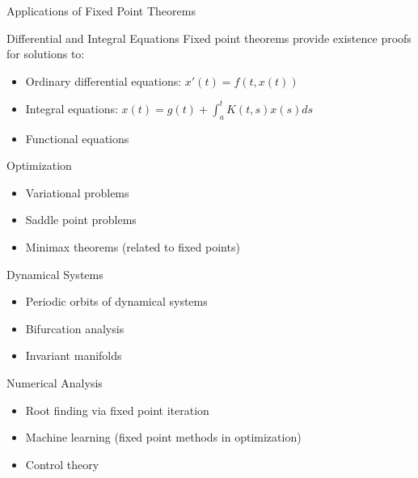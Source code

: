 \documentclass[aspectratio=169,10pt]{beamer}
\begin{document}
\begin{frame}[allowframebreaks]{Applications of Fixed Point Theorems}
    \begin{block}{Differential and Integral Equations}
        Fixed point theorems provide existence proofs for solutions to:
        \begin{itemize}
            \item Ordinary differential equations: $x'(t) = f(t, x(t))$
            \item Integral equations: $x(t) = g(t) + \int_a^t K(t,s) x(s) ds$
            \item Functional equations
        \end{itemize}
    \end{block}

    \begin{block}{Optimization}
        \begin{itemize}
            \item Variational problems
            \item Saddle point problems
            \item Minimax theorems (related to fixed points)
        \end{itemize}
    \end{block}

    \begin{block}{Dynamical Systems}
        \begin{itemize}
            \item Periodic orbits of dynamical systems
            \item Bifurcation analysis
            \item Invariant manifolds
        \end{itemize}
    \end{block}

    \begin{block}{Numerical Analysis}
        \begin{itemize}
            \item Root finding via fixed point iteration
            \item Machine learning (fixed point methods in optimization)
            \item Control theory
        \end{itemize}
    \end{block}
\end{frame}
\end{document}
